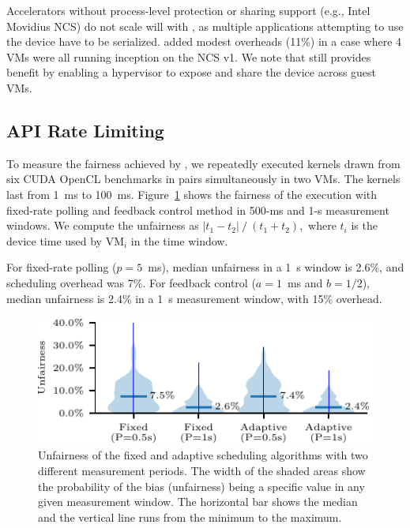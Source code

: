 Accelerators without process-level protection or sharing support (e.g., Intel Movidius NCS) do not scale will with \AvA, as multiple applications attempting to use the device have to be serialized.
\AvA added modest overheads (11\%) in a case where 4 VMs were all running inception on the NCS v1. We note that \AvA still provides benefit by enabling a hypervisor to expose and share the device across guest VMs.

\subsection{API Rate Limiting}
\label{s:eval_rate_limit}

To measure the fairness achieved by \AvA, we repeatedly executed kernels drawn from six CUDA OpenCL benchmarks in pairs simultaneously in two VMs.
The kernels last from 1~ms to 100~ms.
Figure~\ref{fig:fairness} shows the fairness of the execution with fixed-rate polling and feedback control method in 500-ms and 1-s measurement windows.
We compute the unfairness as
$\left|t_1-t_2\right| \mathbin{/} (t_1+t_2),$
where $t_i$ is the device time used by VM$_i$ in the time window.

For fixed-rate polling ($p=5$~ms), median unfairness in a 1~s window is 2.6\%, and scheduling overhead was 7\%.
For feedback control ($a=1$~ms and $b=1/2$),
median unfairness is 2.4\% in a \SI{1}{\second} measurement window, with 15\% overhead.

\begin{figure}
	\centering
    \includegraphics[width=\columnwidth]{ava/data/rate_limit/bias_plot.pdf}%
    \vspace{-.35em}
	\caption{Unfairness of the fixed and adaptive scheduling algorithms with two different measurement periods.
      The width of the shaded areas show the probability of the bias (unfairness) being a specific value in any given measurement window.
      The horizontal bar shows the median and the vertical line runs from the minimum to the maximum.}
	\label{fig:fairness}
\end{figure}


